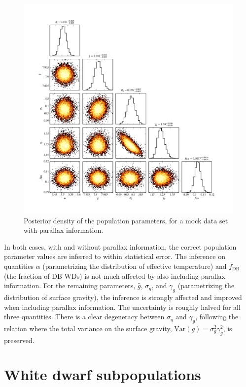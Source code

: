 \documentclass[fleqn,usenatbib]{mnras}
\newcommand{\logg}{g}
\begin{document}
\begin{figure}
	\includegraphics[width=1.\textwidth]{toy_chain_include-parallax.pdf}
    \caption{Posterior density of the population parameters, for a mock data set with parallax information.}
    \label{fig:chain_parallax}
\end{figure}

In both cases, with and without parallax information, the correct population parameter values are inferred to within statistical error. The inference on quantities $\alpha$ (parametrizing the distribution of effective temperature) and $f_\text{DB}$ (the fraction of DB WDs) is not much affected by also including parallax information. For the remaining parameters, $\bar{g}$, $\sigma_g$, and $\gamma_g$ (parametrizing the distribution of surface gravity), the inference is strongly affected and improved when including parallax information. The uncertainty is roughly halved for all three quantities. There is a clear degeneracy between $\sigma_g$ and $\gamma_g$, following the relation where the total variance on the surface gravity, $\text{Var}(\logg) = \sigma_g^2\gamma_g^2$, is preserved.







\section{White dwarf subpopulations}\label{sec:subpopulations}
\end{document}
